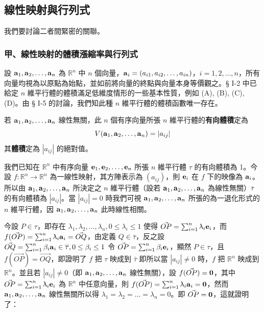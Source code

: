 \subsection{線性映射與行列式}\label{sec:b6s-1-7}
\resetsectcounters

我們要討論二者間緊密的關聯。

\subsubsection*{甲、線性映射的體積漲縮率與行列式}\label{subsec:b6s-1-7-a}

設 $\boldsymbol{\mathbf{a}}_1, \boldsymbol{\mathbf{a}}_2, \dots, \boldsymbol{\mathbf{a}}_n$ 為 $\mathbb{R}^n$ 中 $n$ 個向量，$\boldsymbol{\mathbf{a}}_i=(a_{i1}, a_{i2}, \dots, a_{in})$，$i=1, 2, \dots, n$，所有向量均視為以原點為始點，並如前將向量的終點與向量本身等價觀之。§ I-2 中已給定 $n$ 維平行體的體積滿足低維度情形的一些基本性質，例如 (A), (B), (C), (D)。由 § I-5 的討論，我們知此種 $n$ 維平行體的體積函數唯一存在。

\begin{definition*}\label{def:b6s-1-8}
若 $\boldsymbol{\mathbf{a}}_1, \boldsymbol{\mathbf{a}}_2, \dots, \boldsymbol{\mathbf{a}}_n$ 線性無關，此 $n$ 個有序向量所張 $n$ 維平行體的\textbf{有向體積}定為
\[ V(\boldsymbol{\mathbf{a}}_1, \boldsymbol{\mathbf{a}}_2, \dots, \boldsymbol{\mathbf{a}}_n) = |a_{ij}| \]
其\textbf{體積}定為 $|a_{ij}|$ 的絕對值。
\end{definition*}

我們已知在 $\mathbb{R}^n$ 中有序向量 $\boldsymbol{\mathbf{e}}_1, \boldsymbol{\mathbf{e}}_2, \dots, \boldsymbol{\mathbf{e}}_n$ 所張 $n$ 維平行體 $\tau$ 的有向體積為 1。今設 $f: \mathbb{R}^n \longrightarrow \mathbb{R}^n$ 為一線性映射，其方陣表示為 $(a_{ij})$，則 $\boldsymbol{\mathbf{e}}_i$ 在 $f$ 下的映像為 $\boldsymbol{\mathbf{a}}_i$。所以由 $\boldsymbol{\mathbf{a}}_1, \boldsymbol{\mathbf{a}}_2, \dots, \boldsymbol{\mathbf{a}}_n$ 所決定之 $n$ 維平行體（設若 $\boldsymbol{\mathbf{a}}_1, \boldsymbol{\mathbf{a}}_2, \dots, \boldsymbol{\mathbf{a}}_n$ 為線性無關）$\bar{\tau}$ 的有向體積為 $|a_{ij}|$。當 $|a_{ij}| = 0$ 時我們可視 $\boldsymbol{\mathbf{a}}_1, \boldsymbol{\mathbf{a}}_2, \dots, \boldsymbol{\mathbf{a}}_n$ 所張的為一退化形式的 $n$ 維平行體，因 $\boldsymbol{\mathbf{a}}_1, \boldsymbol{\mathbf{a}}_2, \dots, \boldsymbol{\mathbf{a}}_n$ 此時線性相關。

今設 $P \in \tau$，即存在 $\lambda_1, \lambda_2, \dots, \lambda_n, 0 \le \lambda_i \le 1$ 使得 $\vec{OP} = \sum_{i=1}^n \uplambda_i \boldsymbol{\mathbf{e}}_i$，而 $f(\vec{OP}) = \sum_{i=1}^n \uplambda_i \boldsymbol{\mathbf{a}}_i = \vec{OQ}$，由定義 $Q \in \bar{\tau}$，反之設 $\vec{OQ} = \sum_{i=1}^n \beta_i \boldsymbol{\mathbf{a}}_i \in \overline{\tau}, 0 \le \beta_i \le 1$ 令 $\vec{OP} = \sum_{i=1}^n \beta_i \boldsymbol{\mathbf{e}}_i$，顯然 $P \in \tau$，且 $f(\vec{OP}) = \vec{OQ}$，即證明了 $f$ 把 $\tau$ 映成到 $\bar{\tau}$ 即所以當 $|a_{ij}| \ne 0$ 時，$f$ 把 $\mathbb{R}^n$ 映成到 $\mathbb{R}^n$。並且若 $|a_{ij}| \ne 0$（即 $\boldsymbol{\mathbf{a}}_1, \boldsymbol{\mathbf{a}}_2, \dots, \boldsymbol{\mathbf{a}}_n$ 線性無關），設 $f(\vec{OP}) = \boldsymbol{\mathbf{0}}$，其中 $\vec{OP} = \sum_{i=1}^n \uplambda_i \boldsymbol{\mathbf{e}}_i$ 為 $\mathbb{R}^n$ 中任意向量，則 $f(\vec{OP}) = \sum_{i=1}^n \uplambda_i \boldsymbol{\mathbf{a}}_i = \boldsymbol{\mathbf{0}}$，然而 $\boldsymbol{\mathbf{a}}_1, \boldsymbol{\mathbf{a}}_2, \dots, \boldsymbol{\mathbf{a}}_n$ 線性無關所以得 $\lambda_1 = \lambda_2 = \dots = \lambda_n = 0$。即 $\vec{OP} = \boldsymbol{\mathbf{0}}$，這就證明了：

